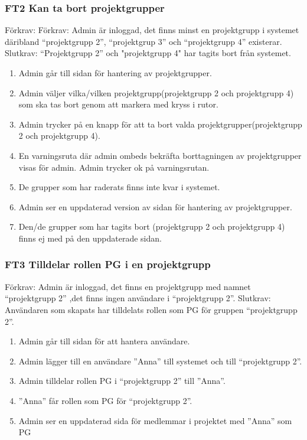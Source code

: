 \documentclass[paper=a4, fontsize=11pt,twoside]{article}
\begin{document}
\subsubsection*{FT2 Kan ta bort projektgrupper}
Förkrav: Förkrav: Admin är inloggad, det finns minst en projektgrupp i systemet
däribland “projektgrupp 2”, “projektgrup 3” och “projektgrupp 4” existerar.
\newline
Slutkrav: “Projektgrupp 2” och "projektgrupp 4" har tagits bort från
systemet.
\begin{enumerate}
	\item Admin går till sidan för hantering av projektgrupper.
	\item Admin väljer vilka/vilken projektgrupp(projektgrupp 2 och projektgrupp 4)
	som ska tas bort genom att markera med kryss i rutor.
	\item Admin trycker på en knapp för att ta bort valda
	projektgrupper(projektgrupp 2 och projektgrupp 4).
	\item En varningsruta där admin ombeds bekräfta borttagningen av projektgrupper
	visas för admin. Admin trycker ok på varningsrutan.
	\item De grupper som har raderats finns inte kvar i systemet.
	\item Admin ser en uppdaterad version av sidan för hantering av projektgrupper.
	\item Den/de grupper som har tagits bort (projektgrupp 2 och projektgrupp 4)
	finns ej med på den uppdaterade sidan.
\end{enumerate}

\subsubsection*{FT3 Tilldelar rollen PG i en projektgrupp}
	Förkrav: Admin är inloggad, det finns en projektgrupp med namnet “projektgrupp 2” ,det finns ingen användare i “projektgrupp 2”.
	\newline
	Slutkrav:  Användaren som skapats har tilldelats rollen som PG för gruppen
	“projektgrupp 2”.
	
	\begin{enumerate}
		\item Admin går till sidan för att hantera användare.
		\item Admin lägger till en användare ”Anna” till systemet och till “projektgrupp 2”.
		\item Admin tilldelar rollen PG i “projektgrupp 2” till ”Anna”.
		\item ”Anna” får rollen som PG för “projektgrupp 2”.
		\item Admin ser en uppdaterad sida för medlemmar i projektet med ”Anna” som PG
	\end{enumerate}
	
\end{document}
